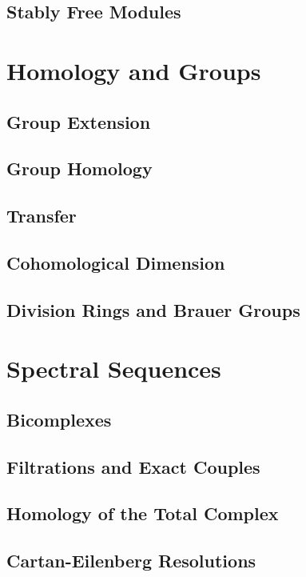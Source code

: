 \documentclass[oneside]{amsbook}
\begin{document}
\section{Stably Free Modules}


\chapter{Homology and Groups}
\section{Group Extension}

\setcounter{section}{3}
\section{Group Homology}

\setcounter{section}{5}
\section{Transfer}

\setcounter{section}{8}
\section{Cohomological Dimension}

\section{Division Rings and Brauer Groups}


\chapter{Spectral Sequences}
\section{Bicomplexes}

\section{Filtrations and Exact Couples}

\setcounter{section}{3}
\section{Homology of the Total Complex}

\section{Cartan-Eilenberg Resolutions}

\end{document}
